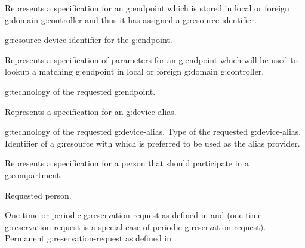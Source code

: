\begin{Api}
Represents a specification for an \gls{g:endpoint} which is stored in local or foreign \gls{g:domain} \gls{g:controller} and thus it has assigned a \gls{g:resource} identifier.
\begin{ApiClassAttributes}
 \Gls{g:resource-device} identifier for the \gls{g:endpoint}.
\end{ApiClassAttributes}

Represents a specification of parameters for an \gls{g:endpoint} which will be used to lookup a matching \gls{g:endpoint} in local or foreign \gls{g:domain} \gls{g:controller}.
\begin{ApiClassAttributes}
 \Gls{g:technology} of the requested \gls{g:endpoint}.
\end{ApiClassAttributes}

Represents a specification for an \gls{g:device-alias}.
\begin{ApiClassAttributes}
 \Gls{g:technology} of the requested \gls{g:device-alias}.
 Type of the requested \gls{g:device-alias}.
 Identifier of a \gls{g:resource} with  which is preferred to be used as the alias provider.
\end{ApiClassAttributes}

Represents a specification for a person that should participate in a \gls{g:compartment}.
\begin{ApiClassAttributes}
 Requested person.
\end{ApiClassAttributes}

\begin{ApiEnumValues}
 One time or periodic \gls{g:reservation-request} as defined in  and  (one time \gls{g:reservation-request} is a special case of periodic \gls{g:reservation-request}).
 Permanent \gls{g:reservation-request} as defined in .
\end{ApiEnumValues}


\end{Api}
